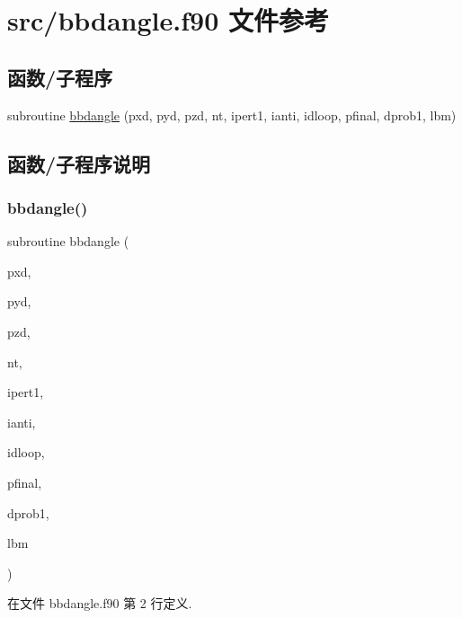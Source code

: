 \hypertarget{bbdangle_8f90}{}\section{src/bbdangle.f90 文件参考}
\label{bbdangle_8f90}
\subsection*{函数/子程序}
\begin{DoxyCompactItemize}
\item 
subroutine \mbox{\hyperlink{bbdangle_8f90_af456b98455d7bcf275c9504421dbb944}{bbdangle}} (pxd, pyd, pzd, nt, ipert1, ianti, idloop, pfinal, dprob1, lbm)
\end{DoxyCompactItemize}


\subsection{函数/子程序说明}
\mbox{\label{bbdangle_8f90_af456b98455d7bcf275c9504421dbb944}} 
\subsubsection{\texorpdfstring{bbdangle()}{bbdangle()}}
{\footnotesize\ttfamily subroutine bbdangle (\begin{DoxyParamCaption}\item[{}]{pxd,  }\item[{}]{pyd,  }\item[{}]{pzd,  }\item[{}]{nt,  }\item[{}]{ipert1,  }\item[{}]{ianti,  }\item[{}]{idloop,  }\item[{}]{pfinal,  }\item[{}]{dprob1,  }\item[{}]{lbm }\end{DoxyParamCaption})}



在文件 bbdangle.\+f90 第 2 行定义.

